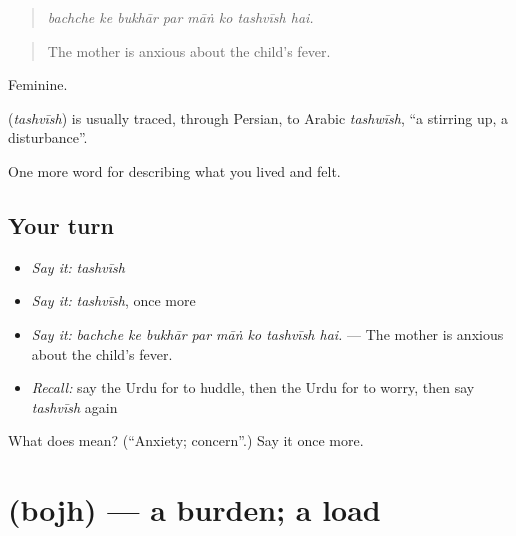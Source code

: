 \begin{quote}
       
\end{quote}

\begin{quote}
\emph{bachche ke bukhār par māṅ ko tashvīsh hai.}
\end{quote}

\begin{quote}
The mother is anxious about the child's fever.
\end{quote}

Feminine.

\begin{cousinweb}
\textbf{} (\emph{tashvīsh}) is usually traced, through Persian, to Arabic \emph{tashwīsh}, \textquotedblleft{}a stirring up, a disturbance\textquotedblright{}.
\end{cousinweb}

\begin{grammarlens}[title={What you've built}]
One more word for describing what you lived and felt.
\end{grammarlens}

\subsection*{Your turn}
\begin{itemize}
\raggedright
  \item \emph{Say it:} \emph{tashvīsh}
  \item \emph{Say it:} \emph{tashvīsh}, once more
  \item \emph{Say it:} \emph{bachche ke bukhār par māṅ ko tashvīsh hai.} — The mother is anxious about the child's fever.
  \item \emph{Recall:} say the Urdu for to huddle, then the Urdu for to worry, then say \emph{tashvīsh} again
\end{itemize}

\begin{tcolorbox}[breakable,colback=teal!4,colframe=teal!35!black,title={Before you move on}]
What does  mean? (\textquotedblleft{}Anxiety; concern\textquotedblright{}.) Say it once more.
\end{tcolorbox}
\section[\texorpdfstring{\ur{بوجھ} (bojh)}{بوجھ (bojh)}]{ (bojh) — a burden; a load}

